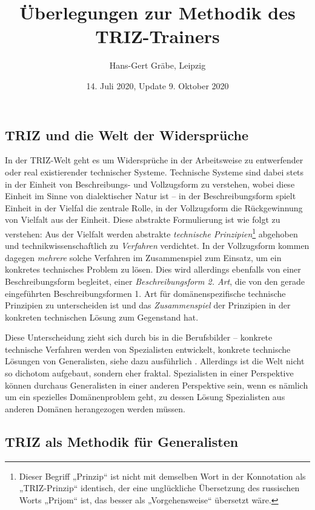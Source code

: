 \documentclass[11pt,a4paper]{article}
\title{Überlegungen zur Methodik des TRIZ-Trainers}
\author{Hans-Gert Gr\"abe, Leipzig}
\date{14. Juli 2020, Update 9. Oktober 2020}
\begin{document}
\maketitle

\subsection*{TRIZ und die Welt der Widersprüche}

In der TRIZ-Welt geht es um Widersprüche in der Arbeitsweise zu entwerfender
oder real existierender technischer Systeme. Technische Systeme sind dabei
stets in der Einheit von Beschreibungs- und Vollzugsform zu verstehen, wobei
diese Einheit im Sinne von \cite{Graebe2020} dialektischer Natur ist -- in der
Beschreibungsform spielt Einheit in der Vielfal die zentrale Rolle, in der
Vollzugsform die Rückgewinnung von Vielfalt aus der Einheit.  Diese abstrakte
Formulierung ist wie folgt zu verstehen: Aus der Vielfalt werden abstrakte
\emph{technische Prinzipien}\footnote{Dieser Begriff „Prinzip“ ist nicht mit
  demselben Wort in der Konnotation als „TRIZ-Prinzip“ identisch, der eine
  unglückliche Übersetzung des russischen Worts „Prijom“ ist, das besser als
  „Vorgehensweise“ übersetzt wäre.} abgehoben und technikwissenschaftlich zu
\emph{Verfahren} verdichtet. In der Vollzugsform kommen dagegen \emph{mehrere}
solche Verfahren im Zusammenspiel zum Einsatz, um ein konkretes technisches
Problem zu lösen. Dies wird allerdings ebenfalls von einer Beschreibungsform
begleitet, einer \emph{Beschreibungsform 2. Art}, die von den gerade
eingeführten Beschreibungsformen 1. Art für domänenspezifische technische
Prinzipien zu unterscheiden ist und das \emph{Zusammenspiel} der Prinzipien in
der konkreten technischen Lösung zum Gegenstand hat.

Diese Unterscheidung zieht sich durch bis in die Berufsbilder -- konkrete
technische Verfahren werden von Spezialisten entwickelt, konkrete technische
Lösungen von Generalisten, siehe dazu ausführlich \cite[Abschnitt
  9]{Graebe2020}.   Allerdings ist die Welt nicht so dichotom aufgebaut,
sondern eher fraktal.  Spezialisten in einer Perspektive können durchaus
Generalisten in einer anderen Perspektive sein, wenn es nämlich um ein
spezielles Domänenproblem geht, zu dessen Lösung Spezialisten aus anderen
Domänen herangezogen werden müssen.

\subsection*{TRIZ als Methodik für Generalisten}
\end{document}

